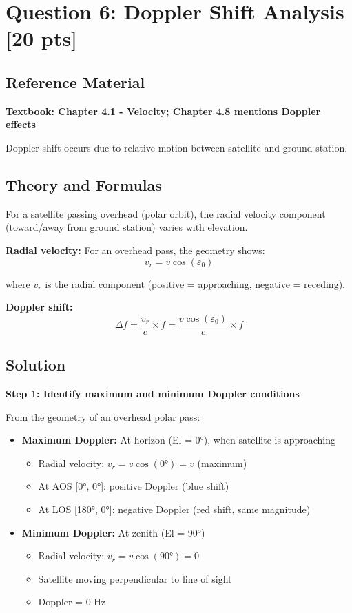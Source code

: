 \documentclass[11pt,letterpaper]{article}
\begin{document}
\section{Question 6: Doppler Shift Analysis [20 pts]}

\subsection{Reference Material}
\textbf{Textbook: Chapter 4.1 - Velocity; Chapter 4.8 mentions Doppler effects}

Doppler shift occurs due to relative motion between satellite and ground station.

\subsection{Theory and Formulas}
For a satellite passing overhead (polar orbit), the radial velocity component (toward/away from ground station) varies with elevation.

\textbf{Radial velocity:}
For an overhead pass, the geometry shows:
\begin{equation}
v_r = v \cos(\varepsilon_0)
\end{equation}

where $v_r$ is the radial component (positive = approaching, negative = receding).

\textbf{Doppler shift:}
\begin{equation}
\Delta f = \frac{v_r}{c} \times f = \frac{v \cos(\varepsilon_0)}{c} \times f
\end{equation}

\subsection{Solution}
\textbf{Step 1: Identify maximum and minimum Doppler conditions}

From the geometry of an overhead polar pass:
\begin{itemize}
    \item \textbf{Maximum Doppler:} At horizon (El = 0°), when satellite is approaching
    \begin{itemize}
        \item Radial velocity: $v_r = v \cos(0°) = v$ (maximum)
        \item At AOS [0°, 0°]: positive Doppler (blue shift)
        \item At LOS [180°, 0°]: negative Doppler (red shift, same magnitude)
    \end{itemize}
    \item \textbf{Minimum Doppler:} At zenith (El = 90°)
    \begin{itemize}
        \item Radial velocity: $v_r = v \cos(90°) = 0$
        \item Satellite moving perpendicular to line of sight
        \item Doppler = 0 Hz
    \end{itemize}
\end{itemize}
\end{document}

